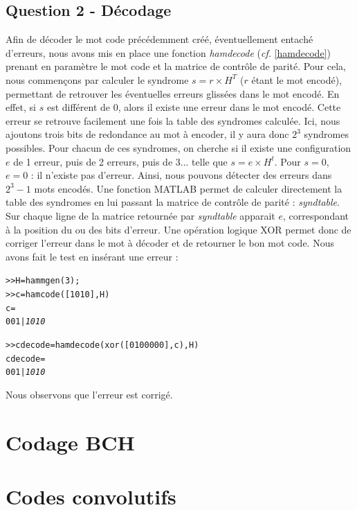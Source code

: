 \documentclass[a4paper, 12pt]{article}
\begin{document}
\subsection{Question 2 - Décodage}

Afin de décoder le mot code précédemment créé, éventuellement entaché d'erreurs, nous avons mis en place une fonction \textit{hamdecode} (\textit{cf.} \ref{hamdecode}) prenant en paramètre le mot code et la matrice de contrôle de parité.
Pour cela, nous commençons par calculer le syndrome $s = r\times H^T$ ($r$ étant le mot encodé), permettant de retrouver les éventuelles erreurs glissées dans le mot encodé. En effet, si $s$ est différent de 0, alors il existe une erreur dans le mot encodé. Cette erreur se retrouve facilement une fois la table des syndromes calculée.
Ici, nous ajoutons trois bits de redondance au mot à encoder, il y aura donc $2^3$ syndromes possibles. Pour chacun de ces syndromes, on cherche si il existe une configuration $e$ de 1 erreur, puis de 2 erreurs, puis de 3... telle que $s = e \times H^t$. Pour $s=0$, $e=0$ : il n'existe pas d'erreur. Ainsi, nous pouvons détecter des erreurs dans $2^3 - 1$ mots encodés. Une fonction MATLAB permet de calculer directement la table des syndromes en lui passant la matrice de contrôle de parité : \textit{syndtable}. Sur chaque ligne de la matrice retournée par \textit{syndtable} apparait $e$, correspondant à la position du ou des bits d'erreur. Une opération logique XOR permet donc de corriger l'erreur dans le mot à décoder et de retourner le bon mot code. Nous avons fait le test en insérant une erreur :
\begin{alltt}
>> H = hammgen(3); %
>> c = hamcode([1 0 1 0], H) %
c =
     0     0     1   |   \textit{1     0     1     0}
		
>> cdecode = hamdecode( xor([0 1 0 0 0 0 0], c), H)
cdecode =
     0     0     1   |   \textit{1     0     1     0}
\end{alltt}

Nous observons que l'erreur est corrigé.

\section{Codage BCH}

\section{Codes convolutifs}
\end{document}
